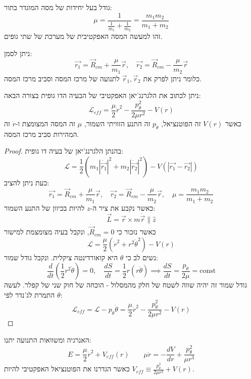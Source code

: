 \documentclass{tstextbook}
\begin{document}
\begin{definition}
גודל בעל יחידות של מסה המוגדר בתור:
$$\mu=\frac{1}{\frac{1}{m_{1}}+\frac{1}{m_{2}}}=\frac{m_1m_2}{m_1+m_2}$$
זהו למעשה המסה האפקטיבית של מערכת של שתי גופים.

\end{definition}
\begin{symbolize}
ניתן לסמן:
$$\vec{r_1}=\vec{R}_{cm}+\frac{\mu}{m_1}\vec{r},\quad\vec{r_2}=\vec{R}_{cm}-\frac{\mu}{m_2}\vec{r}$$
כלומר ניתן לפרק את \(\vec{r}_{1},\vec{r}_{2}\) לתנועה של מרכז המסה וסביב מרכז המסה.

\end{symbolize}
\begin{proposition}
ניתן לכתוב את הלגרנג'יאן האפקטיבי של הבעיה הדו גופית בצורה הבאה:
$$\mathcal{L}_{eff}= \frac\mu2\dot{r}^2-\frac{p_\theta^2}{2\mu r^2}-V(r)$$
כאשר \(V(r)\) זה הפוטנציאל, \(p_{\theta}\) זה התנע הזוויתי השמור, \(\mu\) זה המסה המצומצת ו-\(\dot{r}\) זה המהירות סביב מרכז המסה.

\end{proposition}
\begin{proof}
בהנתן הלגרנג'יאן של בעיה דו גופית:
$$ \mathcal{L}=\frac12\left(m_1\left|\dot{\vec{r_1}}\right|^2+m_2\left|\dot{\vec{r_2}}\right|^2\right)-V\left(|\vec{r_1}-\vec{r_2}|\right)$$
כעת ניתן להציב:
$$ \vec{r_1}=\vec{R}_{cm}+\frac{\mu}{m_1}\vec{r},\quad\vec{r_2}=\vec{R}_{cm}-\frac{\mu}{m_2}\vec{r},\quad\mu=\frac{m_1m_2}{m_1+m_2}$$
כאשר נקבע את ציר ה-\(z\) להיות בכיוון של התנע השמור:
$$ \vec{L}=\vec{r}\times m\dot{\vec{r}}\parallel\hat{z}$$
כאשר נזכור כי \(\dot{\vec{R}}_{cm}=0\), ונקבל בעיה מצומצמת למישור
$$ \mathcal{L}=\frac\mu2\left( \dot{r}^2+r^2\dot{\theta}^2 \right)-V(r)$$
נשים לב כי \(\theta\) היא קואורדינטה ציקלית. ונקבל גודל שמור:
$$ \frac d{dt}\left(\frac12r^2\dot{\theta}\right)=0,\quad\frac{dS}{dt}=\frac12r\left(r\dot{\theta}\right)\implies\frac{dS}{dt}=\frac{p_\theta}{2\mu}=\mathrm{const}$$
גודל שמור זה יהיה שווה לשטח של חלק מהמסלול - הוכחה של חוק שני של קפלר.
לעשה התמרת לג'נדר לפי \(\theta\):
$$ \mathcal{L}_{eff}=\mathcal{L}-p_\theta\dot{\theta}=\boxed{ \frac\mu2\dot{r}^2-\frac{p_\theta^2}{2\mu r^2}-V(r) }$$

\end{proof}
\begin{corollary}
האנרגיה ומשוואות התנועה יתנו:
$$E=\frac{\mu}{2}\dot{r}^2+V_{eff}(r) \qquad \mu\ddot{r}=-\frac{dV}{dr}+\frac{p_\theta^2}{\mu r^3}$$
כאשר הגדרנו את הפוטנציאל האפקטיבי להיות \(V_{eff}\equiv\frac{p_\theta^2}{2\mu r^2}+V(r)\).

\end{corollary}
\end{document}
